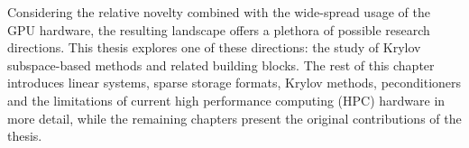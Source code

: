 Considering the relative novelty combined with the wide-spread usage of the
GPU hardware, the resulting landscape offers a plethora of possible research
directions. This thesis explores one of these directions: the study of Krylov
subspace-based methods and related building blocks. The rest of this chapter
introduces linear systems, sparse storage formats, Krylov methods,
peconditioners and the limitations of current high performance computing (HPC)
hardware in more detail, while the remaining chapters present the original
contributions of the thesis.
